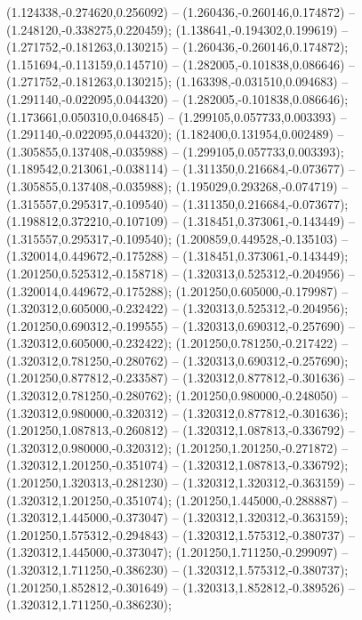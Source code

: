  (1.124338,-0.274620,0.256092) -- (1.260436,-0.260146,0.174872) -- (1.248120,-0.338275,0.220459);
 (1.138641,-0.194302,0.199619) -- (1.271752,-0.181263,0.130215) -- (1.260436,-0.260146,0.174872);
 (1.151694,-0.113159,0.145710) -- (1.282005,-0.101838,0.086646) -- (1.271752,-0.181263,0.130215);
 (1.163398,-0.031510,0.094683) -- (1.291140,-0.022095,0.044320) -- (1.282005,-0.101838,0.086646);
 (1.173661,0.050310,0.046845) -- (1.299105,0.057733,0.003393) -- (1.291140,-0.022095,0.044320);
 (1.182400,0.131954,0.002489) -- (1.305855,0.137408,-0.035988) -- (1.299105,0.057733,0.003393);
 (1.189542,0.213061,-0.038114) -- (1.311350,0.216684,-0.073677) -- (1.305855,0.137408,-0.035988);
 (1.195029,0.293268,-0.074719) -- (1.315557,0.295317,-0.109540) -- (1.311350,0.216684,-0.073677);
 (1.198812,0.372210,-0.107109) -- (1.318451,0.373061,-0.143449) -- (1.315557,0.295317,-0.109540);
 (1.200859,0.449528,-0.135103) -- (1.320014,0.449672,-0.175288) -- (1.318451,0.373061,-0.143449);
 (1.201250,0.525312,-0.158718) -- (1.320313,0.525312,-0.204956) -- (1.320014,0.449672,-0.175288);
 (1.201250,0.605000,-0.179987) -- (1.320312,0.605000,-0.232422) -- (1.320313,0.525312,-0.204956);
 (1.201250,0.690312,-0.199555) -- (1.320313,0.690312,-0.257690) -- (1.320312,0.605000,-0.232422);
 (1.201250,0.781250,-0.217422) -- (1.320312,0.781250,-0.280762) -- (1.320313,0.690312,-0.257690);
 (1.201250,0.877812,-0.233587) -- (1.320312,0.877812,-0.301636) -- (1.320312,0.781250,-0.280762);
 (1.201250,0.980000,-0.248050) -- (1.320312,0.980000,-0.320312) -- (1.320312,0.877812,-0.301636);
 (1.201250,1.087813,-0.260812) -- (1.320312,1.087813,-0.336792) -- (1.320312,0.980000,-0.320312);
 (1.201250,1.201250,-0.271872) -- (1.320312,1.201250,-0.351074) -- (1.320312,1.087813,-0.336792);
 (1.201250,1.320313,-0.281230) -- (1.320312,1.320312,-0.363159) -- (1.320312,1.201250,-0.351074);
 (1.201250,1.445000,-0.288887) -- (1.320312,1.445000,-0.373047) -- (1.320312,1.320312,-0.363159);
 (1.201250,1.575312,-0.294843) -- (1.320312,1.575312,-0.380737) -- (1.320312,1.445000,-0.373047);
 (1.201250,1.711250,-0.299097) -- (1.320312,1.711250,-0.386230) -- (1.320312,1.575312,-0.380737);
 (1.201250,1.852812,-0.301649) -- (1.320313,1.852812,-0.389526) -- (1.320312,1.711250,-0.386230);
